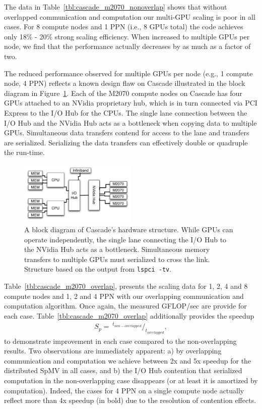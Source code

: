 The data in Table~\ref{tbl:cascade_m2070_nonoverlap} shows that without overlapped communication and computation our multi-GPU scaling is poor in all cases. For 8 compute nodes and 1 PPN (i.e., 8 GPUs total) the code achieves only 18\% - 20\% strong scaling efficiency. When increased to multiple GPUs per node, we find that the performance actually decreases by as much as a factor of two. 

The reduced performance observed for multiple GPUs per node (e.g., 1 compute node, 4 PPN) reflects a known design flaw on Cascade illustrated in the block diagram in Figure~\ref{fig:cascade_iohub}. Each of the M2070 compute nodes on Cascade has four GPUs attached to an NVidia proprietary hub, which is in turn connected via PCI Express to the I/O Hub for the CPUs. The single lane connection between the I/O Hub and the NVidia Hub acts as a bottleneck when copying data to multiple GPUs. Simultaneous data transfers contend for access to the lane and transfers are serialized. Serializing the data transfers can effectively double or quadruple the run-time. 

\begin{figure}
\centering
\includegraphics[width=0.5\textwidth]{gpu_content/omnigraffle/CascadeIOHub.pdf}
\caption{A block diagram of Cascade's hardware structure. While GPUs can operate independently, the single lane connecting the I/O Hub to the NVidia Hub acts as a bottleneck. Simultaneous memory transfers to multiple GPUs must serialized to cross the link. Structure based on the output from \texttt{lspci -tv}. }
\label{fig:cascade_iohub}
\end{figure}

Table~\ref{tbl:cascade_m2070_overlap}, presents the scaling data for 1, 2, 4 and 8 compute nodes and 1, 2 and 4 PPN with our overlapping communication and computation algorithm. Once again, the measured GFLOP/sec are provide for each case. Table~\ref{tbl:cascade_m2070_overlap} additionally provides the speedup
\begin{align*} 
S_p = \ ^{t_{non-overlapped}} /_{t_{overlapped}},
\end{align*}
to demonstrate improvement in each case compared to the non-overlapping results. Two observations are immediately apparent: a) by overlapping communication and computation we achieve between 2x and 5x speedup for the distributed SpMV in all cases, and b) the I/O Hub contention that serialized computation in the non-overlapping case disappears (or at least it is amortized by computation). Indeed, the cases for 4 PPN on a single compute node actually reflect more than 4x speedup (in bold) due to the resolution of contention effects.  

